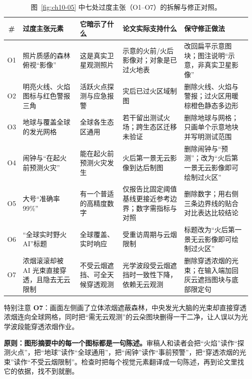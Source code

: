\begin{table}[htbp]\centering\footnotesize
\setlength{\tabcolsep}{3pt}
\renewcommand{\arraystretch}{1.12}
\caption{图~\ref{fig:ch10-05} 中七处过度主张（O1--O7）的拆解与修正对照。}\label{tab:ch10-05-overclaim}
\begin{tabularx}{\linewidth}{@{}c>{\raggedright\arraybackslash}p{25mm}>{\raggedright\arraybackslash}p{25mm}>{\raggedright\arraybackslash}p{26mm}Y@{}}
\toprule
\textbf{\#} & \textbf{过度主张元素} & \textbf{它暗示了什么} & \textbf{论文实际支持什么} & \textbf{保守修正做法} \\
\midrule
O1 & 照片质感的森林俯视“影像” & 这是真实卫星观测照片 & 示意的火前/火后影像对；对象是已过火地表 & 改回扁平示意图块；图注说明“示意，非真实卫星影像” \\
O2 & 明亮火线、火焰图标与红色警报三角 & 活跃火点探测与应急报警 & 灾后已过火区域制图 & 删除火线、火焰与警报；过火区用暖棕橙色静态多边形 \\
O3 & 地球与覆盖全球的发光网格 & 全球各生态区通用 & 若干留出测试火场；跨生态区迁移未验证 & 删除地球与网格；只画单个示意地块并写明测试范围 \\
O4 & 闹钟与“在起火前预测火灾” & 能在起火前预测火灾发生 & 火后第一景无云影像到达后制图 & 删除闹钟与“预测”；改为“火后第一景无云影像即可绘制过火区” \\
O5 & 大号“准确率 99\%” & 有一个普适的高精度数字 & 仅报告比固定阈值基线更接近参考边界；数字需指标与对照 & 删除数字；用右侧三条边界线的贴合对比表达比较结论 \\
O6 & “全球实时野火 AI”标题 & 全球覆盖、实时响应 & 受重访周期与云烟限制 & 标题改为“火后第一景无云影像即可绘制过火区” \\
O7 & 浓烟滚滚却被 AI 光束直接穿透，且隐去无云限制 & 不受云烟遮挡、可全天候穿透观测 & 光学波段受云烟遮挡时一致性下降，依赖无云观测 & 删除穿透浓烟的光束；在输入端加回灰云遮挡图块与底部限定句 \\
\bottomrule
\end{tabularx}
\end{table}

特别注意 \textbf{O7}：画面左侧画了立体浓烟遮蔽森林，中央发光大脑的光束却直接穿透浓烟连向全球网格，同时把“需无云观测”的云朵图块删得一干二净，让人误以为光学波段能穿透浓烟作业。

\begin{BookNote}
\textbf{原则：图形摘要中的每一个图标都是一句陈述。}审稿人和读者会把“火焰”读作“探测火点”，把“地球”读作“全球通用”，把“闹钟”读作“事前预警”，把“穿透浓烟的光束”读作“不受云烟限制”。检查时把每个视觉元素翻译成一句陈述，再到论文里找它的依据，找不到就删。
\end{BookNote}


